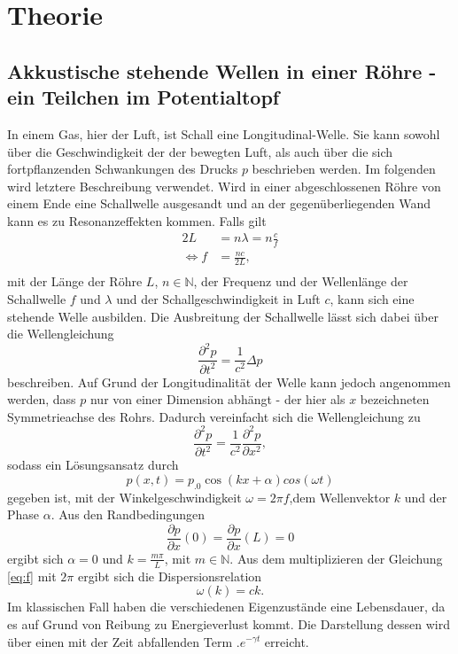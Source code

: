 \section{Theorie}
\label{sec:Theorie}

\subsection{Akkustische stehende Wellen in einer Röhre - ein Teilchen im Potentialtopf}
In einem Gas, hier der Luft, ist Schall eine Longitudinal-Welle. Sie kann sowohl über die Geschwindigkeit der der bewegten Luft, als auch über die sich fortpflanzenden Schwankungen des Drucks $p$ beschrieben werden. Im folgenden wird letztere Beschreibung verwendet.
Wird in einer abgeschlossenen Röhre von einem Ende eine Schallwelle ausgesandt und an der gegenüberliegenden Wand kann es zu Resonanzeffekten kommen. Falls gilt
\begin{align}
2L&=n\lambda=n\frac{c}{f}\\
\Leftrightarrow f&=\frac{n c}{2L},\\\label{eq:f}
\end{align}
mit der Länge der Röhre $L$, $n\in\mathbb{N}$, der Frequenz und der Wellenlänge der Schallwelle $f$ und $\lambda$ und der Schallgeschwindigkeit in Luft $c$, kann sich eine stehende Welle ausbilden.
Die Ausbreitung der Schallwelle lässt sich dabei über die Wellengleichung
\[
\frac{\partial^2 p}{\partial t^2}=\frac{1}{c^2}\Delta p
\]
beschreiben. Auf Grund der Longitudinalität der Welle kann jedoch angenommen werden, dass $p$ nur von einer Dimension abhängt - der hier als $x$ bezeichneten Symmetrieachse des Rohrs. Dadurch vereinfacht sich die Wellengleichung zu
\[
\frac{\partial^2 p}{\partial t^2}=\frac{1}{c^2}\frac{\partial^2 p}{\partial x^2},
\]
sodass ein Lösungsansatz durch
\[
p(x,t)=p_.0\cos(k x +\alpha)cos(\omega t)
\]
gegeben ist, mit der Winkelgeschwindigkeit $\omega=2\pi f$,dem Wellenvektor $k$ und der Phase $\alpha$. Aus den Randbedingungen 
\[
\frac{\partial p}{\partial x}(0)=\frac{\partial p}{\partial x}(L)=0
\]
ergibt sich $\alpha=0$ und $k=\frac{m\pi}{L}$, mit $m\in\mathbb{N}$.
Aus dem multiplizieren der Gleichung \eqref{eq:f} mit $2\pi$ ergibt sich die Dispersionsrelation
\begin{equation}
\omega(k)=c k\text{.}\label{eq:omega_k}
\end{equation}
Im klassischen Fall haben die verschiedenen Eigenzustände eine Lebensdauer, da es auf Grund von Reibung zu Energieverlust kommt.
Die Darstellung dessen wird über einen mit der Zeit abfallenden Term $.e^{-\gamma t}$ erreicht.
